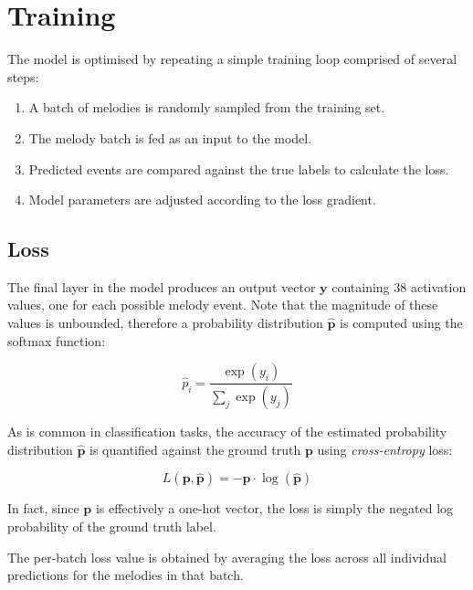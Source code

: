 \documentclass[../../report.tex]{subfiles}
\begin{document}
\section{Training}

The model is optimised by repeating a simple training loop comprised of several
steps:

\begin{enumerate}
  \item A batch of melodies is randomly sampled from the training set.

  \item The melody batch is fed as an input to the model.

  \item Predicted events are compared against the true labels to calculate the
  loss.

  \item Model parameters are adjusted according to the loss gradient.
\end{enumerate}

\subsection{Loss}

The final layer in the model produces an output vector \(\bm{y}\) containing 38
activation values, one for each possible melody event. Note that the magnitude
of these values is unbounded, therefore a probability distribution
\(\bm{\hat{p}}\) is computed using the softmax function:

\begin{equation*}
  \hat{p}_i = \frac{ \exp(y_i) }{ \sum_{j} \exp(y_j) }
\end{equation*}

As is common in classification tasks, the accuracy of the estimated probability
distribution \(\bm{\hat{p}}\) is quantified against the ground truth \(\bm{p}\)
using \emph{cross-entropy} loss:

\begin{equation*}
  L(\bm{p}, \bm{\hat{p}}) = - \bm{p} \cdot \log(\bm{\hat{p}})
\end{equation*}

In fact, since \(\bm{p}\) is effectively a one-hot vector, the loss is simply
the negated log probability of the ground truth label.

The per-batch loss value is obtained by averaging the loss across all individual
predictions for the melodies in that batch.
\end{document}
